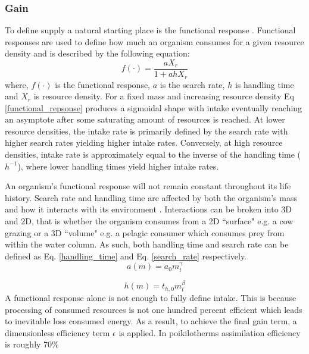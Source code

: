 \documentclass[a4paper, 11pt, hidelinks]{article} %
\begin{document}
	
	\subsubsection{Gain}
	To define supply a natural starting place is the functional response \parencite{Holling1959}.  Functional responses  are used to define how much an organism consumes for a given resource density and is described by the following equation:	
	\begin{equation}
		\label{functional_repsonse}
		f(\cdot) = \frac{a X_r}{1 + a h X_r}
	\end{equation}
	where, $ f(\cdot) $ is the functional response, $ a $ is the search rate, $ h $ is handling time and $ X_r $ is resource density.  
	For a fixed mass and increasing resource density Eq \ref{functional_repsonse} produces a sigmoidal shape with intake eventually reaching an asymptote after some saturating amount of resources is reached.  At lower resource densities, the intake rate is primarily defined by the search rate with higher search rates yielding higher intake rates.  Conversely, at high resource densities, intake rate is approximately equal to the inverse of the handling time ($ h^{-1} $), where lower handling times yield higher intake rates.  
	
	An organism's functional response will not remain constant throughout its life history.  Search rate and handling time are affected by both the organism's mass and how it interacts with its environment \parencite{Pawar2012}.  
	Interactions can be broken into 3D and 2D, that is whether the organism consumes from a 2D ``surface" e.g. a cow grazing or a 3D ``volume" e.g. a pelagic consumer which consumes prey from within the water column.  As such, both handling time and search rate can be defined as Eq. \ref{handling_time} and Eq. \ref{search_rate} respectively.
	\begin{equation}
		\label{search_rate}
		a(m) = a_0 m_t^\gamma
	\end{equation}
	
	\begin{equation}
		\label{handling_time}
		h(m) = t_{h,0} m_t^\beta
	\end{equation}
	A functional response alone is not enough to fully define intake.  This is because processing of consumed resources is not one hundred percent efficient which leads to inevitable loss consumed energy.  As a result, to achieve the final gain term, a dimensionless efficiency term $\epsilon$ is applied.  In poikilotherms assimilation efficiency is roughly 70\% \parencite{Peters1983}
	
\end{document}
